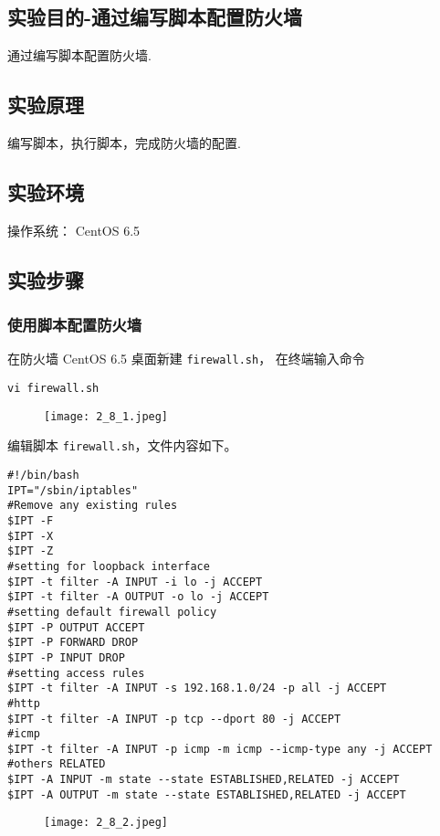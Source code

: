 \subsection{实验目的-通过编写脚本配置防火墙}
通过编写脚本配置防火墙.
%
\subsection{实验原理}
编写脚本，执行脚本，完成防火墙的配置.
%
\subsection{实验环境}
操作系统： CentOS 6.5
%
\subsection{实验步骤}
\subsubsection{使用脚本配置防火墙}
在防火墙 CentOS 6.5 桌面新建 \texttt{firewall.sh}，
在终端输入命令
\begin{verbatim}
vi firewall.sh
\end{verbatim}
\begin{figure}[H]
  \begin{center}
    \texttt{[image: 2\_8\_1.jpeg]}
  \end{center}
\end{figure}

编辑脚本 \texttt{firewall.sh}，文件内容如下。
\begin{verbatim}
#!/bin/bash
IPT="/sbin/iptables"
#Remove any existing rules
$IPT -F
$IPT -X
$IPT -Z
#setting for loopback interface
$IPT -t filter -A INPUT -i lo -j ACCEPT
$IPT -t filter -A OUTPUT -o lo -j ACCEPT
#setting default firewall policy
$IPT -P OUTPUT ACCEPT
$IPT -P FORWARD DROP
$IPT -P INPUT DROP
#setting access rules
$IPT -t filter -A INPUT -s 192.168.1.0/24 -p all -j ACCEPT
#http
$IPT -t filter -A INPUT -p tcp --dport 80 -j ACCEPT
#icmp
$IPT -t filter -A INPUT -p icmp -m icmp --icmp-type any -j ACCEPT
#others RELATED
$IPT -A INPUT -m state --state ESTABLISHED,RELATED -j ACCEPT
$IPT -A OUTPUT -m state --state ESTABLISHED,RELATED -j ACCEPT
\end{verbatim}
\begin{figure}[H]
  \begin{center}
    \texttt{[image: 2\_8\_2.jpeg]}
  \end{center}
\end{figure}

